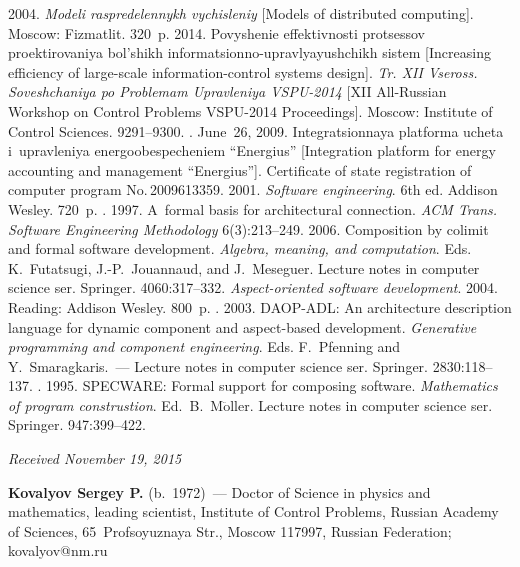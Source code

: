 \begin{multicols}{2}
{{\begin{thebibliography}{99}
 2004.  \textit{Modeli raspredelennykh vychisleniy} [Models of distributed 
computing]. Moscow: Fizmatlit. 320~p.
 2014. Povyshenie effektivnosti pro\-tses\-sov proektirovaniya bol'shikh 
informatsionno-up\-rav\-lya\-yushchikh sistem [Increasing efficiency of large-scale information-control 
systems design]. \textit{Tr. XII Vseross. Soveshchaniya po Problemam Upravleniya VSPU-2014} 
[XII All-Russian Workshop on Control Problems VSPU-2014 Proceedings]. Moscow: Institute of 
Control Sciences.  9291--9300.
. 
June~26, 2009. Integratsionnaya 
platforma ucheta i~upravleniya energoobespecheniem ``Energius'' [Integration platform for energy 
accounting and management ``Energius'']. Certificate of state registration of computer program 
No.\,2009613359. 
 2001. \textit{Software engineering}. 6th ed. Addison Wesley. 720~p.
. 1997. A~formal basis for architectural connection. \textit{ACM 
Trans. Software Engineering Methodology} 6(3):213--249.
 2006.  Composition by colimit and formal software development. 
\textit{Algebra, meaning, and computation}.
Eds. K.~Futatsugi, J.-P.~Jouannaud, and J.~Meseguer.
Lecture notes  in computer science ser. Springer.  4060:317--332.
 \textit{Aspect-oriented software development}. 2004. Reading: Addison Wesley. 800~p.
. 2003. DAOP-ADL: An architecture description 
language for dynamic component and aspect-based development. 
\textit{Generative programming and component
engineering}. Eds. F.~Pfenning and Y.~Smaragkaris.~---
Lecture notes in computer science ser.  Springer. 2830:118--137.
. 1995. SPECWARE: Formal support for 
composing software. 
\textit{Mathematics of program construstion}.
Ed.\ B.~M$\ddot{\mbox{o}}$ller.
Lecture notes in computer science ser.  Springer. 947:399--422.
\end{thebibliography}

 }
 }

\end{multicols}

\vspace*{-3pt}

\hfill{\small\textit{Received November 19, 2015}}

\Contrl

\noindent
\textbf{Kovalyov Sergey P.} (b.\ 1972)~---
Doctor of Science in physics and mathematics, leading scientist, Institute of Control 
Problems, Russian Academy of Sciences, 65~Profsoyuznaya Str., Moscow 117997, 
Russian Federation; kovalyov@nm.ru

\label{end\stat}


\renewcommand{\bibname}{\protect\rm Литература}